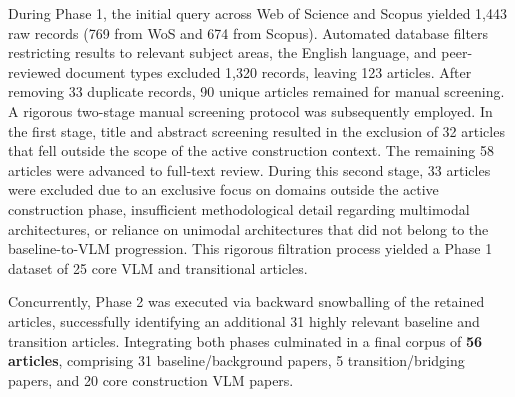 \documentclass[10pt,letterpaper]{article}
\begin{document}
During Phase 1, the initial query across Web of Science and Scopus yielded 1,443 raw records (769 from WoS and 674 from Scopus). Automated database filters restricting results to relevant subject areas, the English language, and peer-reviewed document types excluded 1,320 records, leaving 123 articles. After removing 33 duplicate records, 90 unique articles remained for manual screening. A rigorous two-stage manual screening protocol was subsequently employed. In the first stage, title and abstract screening resulted in the exclusion of 32 articles that fell outside the scope of the active construction context. The remaining 58 articles were advanced to full-text review. During this second stage, 33 articles were excluded due to an exclusive focus on domains outside the active construction phase, insufficient methodological detail regarding multimodal architectures, or reliance on unimodal architectures that did not belong to the baseline-to-VLM progression. This rigorous filtration process yielded a Phase 1 dataset of 25 core VLM and transitional articles.

Concurrently, Phase 2 was executed via backward snowballing of the retained articles, successfully identifying an additional 31 highly relevant baseline and transition articles. Integrating both phases culminated in a final corpus of \textbf{56 articles}, comprising 31 baseline/background papers, 5 transition/bridging papers, and 20 core construction VLM papers.
\end{document}
